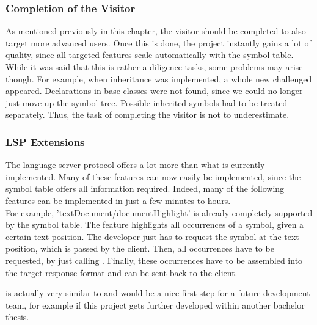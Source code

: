 \subsubsection{Completion of the Visitor}
As mentioned previously in this chapter, the visitor should be completed to also target more advanced users.
Once this is done, the project instantly gains a lot of quality, since all targeted features scale automatically with the symbol table.
While it was said that this is rather a diligence tasks, some problems may arise though.
For example, when inheritance was implemented, a whole new challenged appeared.
Declarations in base classes were not found, since we could no longer just move up the symbol tree.
Possible inherited symbols had to be treated separately.
Thus, the task of completing the visitor is not to underestimate.

\subsubsection{LSP Extensions}
The language server protocol \cite{lspspec} offers a lot more than what is currently implemented.
Many of these features can now easily be implemented, since the symbol table offers all information required.
Indeed, many of the following features can be implemented in just a few minutes to hours.\\

For example, 'textDocument/documentHighlight' \cite{lspspec} is already completely supported by the symbol table.
The feature highlights all occurrences of a symbol, given a certain text position.
The developer just has to request the symbol at the text position, which is passed by the client.
Then, all occurrences have to be requested, by just calling .
Finally, these occurrences have to be assembled into the target response format  and can be sent back to the client.

 is actually very similar to  and would be a nice first step for a future development team,
for example if this project gets further developed within another bachelor thesis.\\

